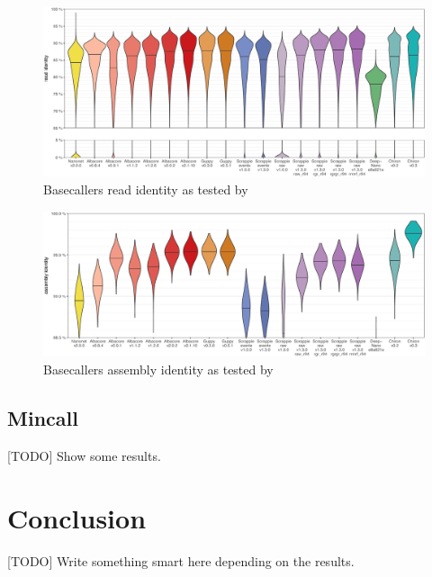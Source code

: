 \documentclass[times, utf8, diplomski, english]{fer}
\begin{document}
\begin{figure}
    \begin{center}
        \includegraphics[width=\textwidth]{rwick_read_identity}
        \caption{Basecallers read identity as tested by~\citep{rwick_basecalling_cmp}}
        \label{fg:rwick_identity}
    \end{center}
\end{figure} 

\begin{figure}
    \begin{center}
        \includegraphics[width=\textwidth]{rwick_assembly_identity}
        \caption{Basecallers assembly identity as tested by~\citep{rwick_basecalling_cmp}}
        \label{fg:rwick_consensus}
    \end{center}
\end{figure} 

\section{Mincall}
[TODO] Show some results.

\chapter{Conclusion}

[TODO] Write something smart here depending on the results. 



% 
\end{document}
